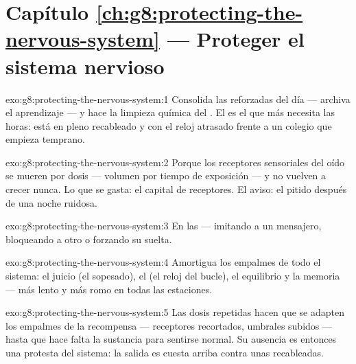 \section*{Capítulo \ref{ch:g8:protecting-the-nervous-system} --- Proteger el sistema nervioso}

\begin{solution}{exo:g8:protecting-the-nervous-system:1}
Consolida las  reforzadas del día --- archiva el aprendizaje
--- y hace la limpieza química del . El   es
el que más necesita las horas: está en pleno recableado y con el reloj
atrasado frente a un colegio que empieza temprano.
\end{solution}

\begin{solution}{exo:g8:protecting-the-nervous-system:2}
Porque los receptores sensoriales del oído se mueren por dosis ---
volumen por tiempo de exposición --- y no vuelven a crecer nunca. Lo
que se gasta: el capital de receptores. El aviso: el pitido después de
una noche ruidosa.
\end{solution}

\begin{solution}{exo:g8:protecting-the-nervous-system:3}
En las  --- imitando a un mensajero, bloqueando a otro o
forzando su suelta.
\end{solution}

\begin{solution}{exo:g8:protecting-the-nervous-system:4}
Amortigua los empalmes de todo el sistema: el juicio (el sopesado), el
 (el reloj del bucle), el equilibrio y la memoria ---
más lento y más romo en todas las estaciones.
\end{solution}

\begin{solution}{exo:g8:protecting-the-nervous-system:5}
Las dosis repetidas hacen que se adapten los empalmes de la recompensa
--- receptores recortados, umbrales subidos --- hasta que hace falta la
sustancia para sentirse normal. Su ausencia es entonces una protesta
del sistema: la salida es cuesta arriba contra unas 
recableadas.
\end{solution}


